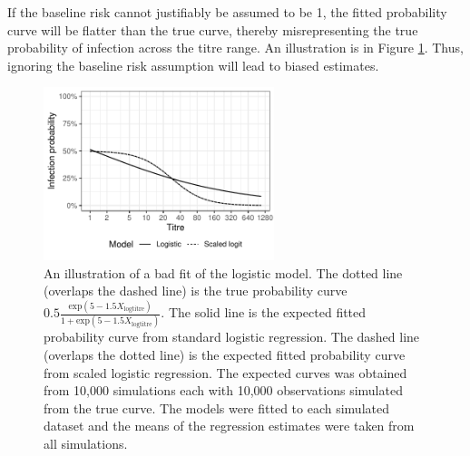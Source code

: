 If the baseline risk cannot justifiably be assumed to be 1, the fitted probability curve will be flatter than the true curve, thereby misrepresenting the true probability of infection across the titre range. An illustration is in Figure \ref{LogisticFit}. Thus, ignoring the baseline risk assumption will lead to biased estimates.



\begin{figure}[htp]
	\centering
	\includegraphics[width=0.6\textwidth]{../logistic-plot/lrex.pdf}
	\caption{
	An illustration of a bad fit of the logistic model. The dotted line (overlaps the dashed line) is the true probability curve $0.5\frac{\text{exp}(5 - 1.5 X_{\text{logtitre}})}{1 + \text{exp}(5 - 1.5 X_{\text{logtitre}})}$. The solid line is the expected fitted probability curve from standard logistic regression. The dashed line (overlaps the dotted line) is the expected fitted probability curve from scaled logistic regression. The expected curves was obtained from 10,000 simulations each with 10,000 observations simulated from the true curve. The models were fitted to each simulated dataset and the means of the regression estimates were taken from all simulations.
	}
	\label{LogisticFit}
\end{figure}
